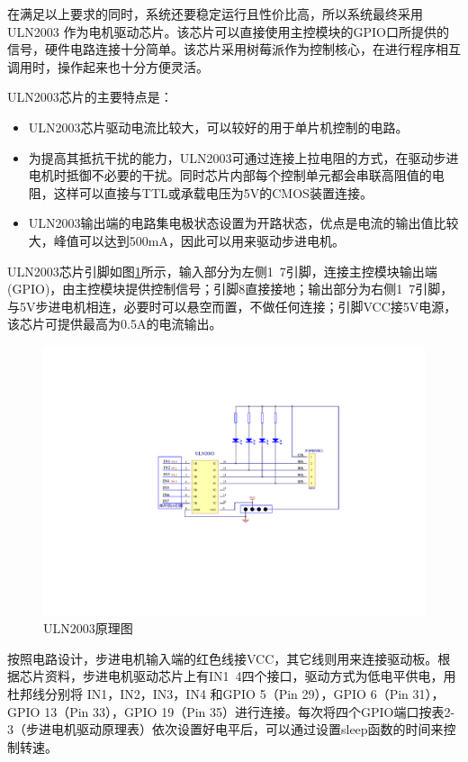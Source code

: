 在满足以上要求的同时，系统还要稳定运行且性价比高，所以系统最终采用 ULN2003 作为电机驱动芯片。该芯片可以直接使用主控模块的GPIO口所提供的信号，硬件电路连接十分简单。该芯片采用树莓派作为控制核心，在进行程序相互调用时，操作起来也十分方便灵活。

ULN2003芯片的主要特点是：
\begin{itemize}
	\item ULN2003芯片驱动电流比较大，可以较好的用于单片机控制的电路。
	\item 为提高其抵抗干扰的能力，ULN2003可通过连接上拉电阻的方式，在驱动步进电机时抵御不必要的干扰。同时芯片内部每个控制单元都会串联高阻值的电阻，这样可以直接与TTL或承载电压为5V的CMOS装置连接。
	\item ULN2003输出端的电路集电极状态设置为开路状态，优点是电流的输出值比较大，峰值可以达到500mA，因此可以用来驱动步进电机。
\end{itemize}

ULN2003芯片引脚如图\ref{fig:ULN2003原理图}所示，输入部分为左侧1~7引脚，连接主控模块输出端(GPIO)，由主控模块提供控制信号；引脚8直接接地；输出部分为右侧1~7引脚，与5V步进电机相连，必要时可以悬空而置，不做任何连接；引脚VCC接5V电源，该芯片可提供最高为0.5A的电流输出。

\begin{figure}[htbp]
	\centering
	\includegraphics[width=\textwidth]{figure/hardware-pin.pdf}
	\caption{ULN2003原理图}\label{fig:ULN2003原理图}
\end{figure}

按照电路设计，步进电机输入端的红色线接VCC，其它线则用来连接驱动板。根据芯片资料，步进电机驱动芯片上有IN1~4四个接口，驱动方式为低电平供电，用杜邦线分别将 IN1，IN2，IN3，IN4 和GPIO 5（Pin 29），GPIO 6（Pin 31），GPIO 13（Pin 33），GPIO 19（Pin 35）进行连接。每次将四个GPIO端口按表2-3（步进电机驱动原理表）依次设置好电平后，可以通过设置sleep函数的时间来控制转速。

